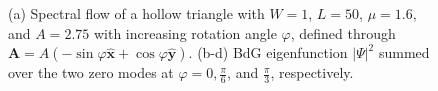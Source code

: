 \documentclass[aps,prb,showpacs,amsmath,twocolumn,amssymb,superscriptaddress]{revtex4-2}
\let\oldhat\hat
\renewcommand{\hat}[1]{\oldhat{\mathbf{#1}}}
\begin{document}
\begin{figure}[ht]
  \hspace{-20pt}
  \hspace{-20pt}
  \caption{(a) Spectral flow of a hollow triangle with $W=1$, $L=50$, $\mu=1.6$, and $A=2.75$ with increasing rotation angle $\varphi$, defined through $\mathbf A = A(-\sin\varphi \hat{x} + \cos\varphi \hat{y})$. (b-d) BdG eigenfunction $|\Psi|^2$ summed over the two zero modes at $\varphi = 0, \frac{\pi}{6}$, and $\frac{\pi}{3}$, respectively.}
  \label{fig: rotation}
\end{figure}
\end{document}

